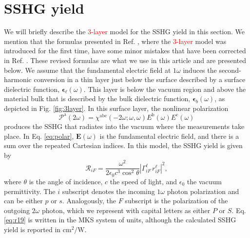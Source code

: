 \documentclass[prb,superscriptaddress,showpacs,twocolumn,letterpaper]{revtex4}
\newcommand{\correction}[1]{\textcolor{red}{#1}}
\begin{document}
\section{SSHG yield}\label{sec:yield}

We will briefly describe the \correction{3-layer} model for the SSHG yield in
this section. We mention that the formulas presented in Ref.
, where the \correction{3-layer} model was introduced for
the first time, have some minor mistakes that have been corrected in Ref.
. These revised formulas are what we use in this
article and are presented below. We assume that the fundamental electric field
at $1\omega$ induces the second-harmonic conversion in a thin layer just below
the surface described by a surface dielectric function,
$\boldsymbol{\epsilon}_{\ell}(\omega)$. This layer is below the vacuum region
and above the material bulk that is described by the bulk dielectric function,
$\boldsymbol{\epsilon}_b(\omega)$, as depicted in Fig.
\ref{fig:3layer}. In this surface layer, the nonlinear polarization
\begin{equation}\label{eq:polar}
\mathcal{P}^{\mathrm{a}}(2\omega) = 
\chi^{\mathrm{abc}}(-2\omega;\omega,\omega)
E^{\mathrm{b}}(\omega)E^{\mathrm{c}}(\omega)
\end{equation}
produces the SSHG that radiates into the vacuum where the measurements take
place. In Eq. \eqref{eq:polar}, $\mathbf{E}(\omega)$ is the fundamental electric
field, and there is a sum over the repeated Cartesian indices. In this model,
the SSHG yield is given by\cite{andersonARXIV16}
\begin{equation}\label{eq:r19}
\mathcal{R}_{iF}=
\frac{\omega^{2}}{2\epsilon_{0}c^{3}\cos^{2}\theta}
\left|\Gamma^{\ell}_{iF}\,r^{\ell}_{iF}\right|^2,
\end{equation}
where $\theta$ is the angle of incidence, $c$ the speed of light, and
$\epsilon_{0}$ the vacuum permittivity. The $i$ subscript denotes the incoming
$1\omega$ photon polarization and can be either $p$ or $s$. Analogously, the $F$
subscript is the polarization of the outgoing $2\omega$ photon, which we
represent with capital letters as either $P$ or $S$. Eq. \eqref{eq:r19} is
written in the MKS system of units, although the calculated SSHG yield is
reported in $\text{cm}^{2}/\text{W}$.
\end{document}
